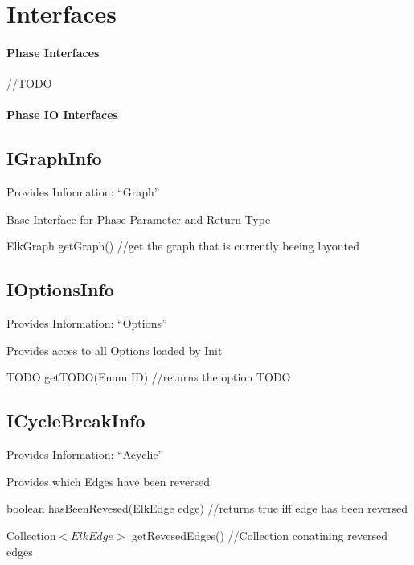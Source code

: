 \section{Interfaces}

\paragraph{Phase Interfaces}

//TODO

\paragraph{Phase IO Interfaces}

\subsection{IGraphInfo}
Provides Information: "`Graph"'

Base Interface for Phase Parameter and Return Type

\begin{list}{}{Functions:}
\item ElkGraph getGraph() //get the graph that is currently beeing layouted
\end{list}

\subsection{IOptionsInfo}
Provides Information: "`Options"'

Provides acces to all Options loaded by Init

\begin{list}{}{Functions:}
\item TODO getTODO(Enum ID) //returns the option TODO %
\end{list}

\subsection{ICycleBreakInfo}
Provides Information: "`Acyclic"'

Provides which Edges have been reversed

\begin{list}{}{Functions:}
\item boolean hasBeenRevesed(ElkEdge edge) //returns true iff edge has been reversed
\item Collection$<ElkEdge>$ getRevesedEdges() //Collection conatining reversed edges
\end{list}

